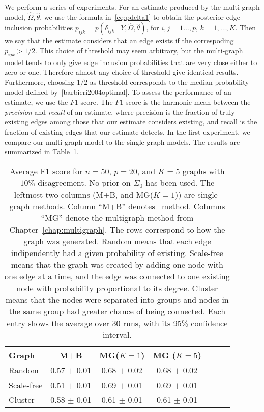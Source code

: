 \documentclass[a4paper, 11pt, oneside]{report}
\newcommand{\1}{\mathds{1}}
\begin{document}
We perform a series of experiments.
For an estimate produced by the multi-graph model, $\hat\Omega, \hat\theta$, we use the formula in~\ref{eq:pdelta1} to obtain the 
posterior edge inclusion probabilities $p_{ijk} = p(\delta_{ijk} \mid Y, \hat\Omega, \hat\theta)$, for $i,j=1\dots,p$, $k=1,\dots,K$.
Then we say that the estimate considers that an edge exists if the correspoding $p_{ijk} > 1/2$.
This choice of threshold may seem arbitrary, but the multi-graph model tends to
only give edge inclusion probabilities that are very close either to 
zero or one.
Therefore almost any choice of threshold give identical results.
Furthermore, choosing $1/2$ as threshold corresponds to the median probability
model defined by~\ref{barbieri2004optimal}.
To assess the performance of an estimate, we use the $F1$ score.
The $F1$ score is the harmonic mean between the \emph{precision} and \emph{recall} of an estimate,
where precision is the fraction of truly existing edges among those that our estimate considers existing,
and recall is the fraction of existing edges that our estimate detects.
In the first experiment, we compare our multi-graph model to the single-graph models.
The results are summarized in Table~\ref{tab:mg-more-graphs}.
\begin{table}[tb]
	\caption{Average F1 score for $n=50$, $p=20$, and $K=5$ graphs with $10\%$ disagreement.
		No prior on $\Sigma_0$ has been used.
		The leftmost two columns (M+B, and MG($K = 1$)) are single-graph methods.
		Column ``M+B'' denotes~\citet{mein2006} method.
		Columns ``MG'' denote the multigraph method from Chapter~\ref{chap:multigraph}.
		The rows correspond to how the graph was generated.
		Random means that each edge indipendently had a given probability of existing.
		Scale-free means that the graph was created by adding one node with one edge at a time, and the edge was connected to one existing node with probability proportional to its degree.
		Cluster means that the nodes were separated into groups and nodes in the same group had greater chance of being connected.
		Each entry shows the average over 30 runs, with its 95\% confidence interval. }
	\label{tab:mg-more-graphs}
	\begin{center}
		\begin{tabular}[c]{l|cccccc}
			\toprule
			Graph      & M+B              & MG($K = 1$)              & MG ($K = 5$)    \\
			\midrule
			Random     & 0.57 $\pm$ 0.01 & 0.68 $\pm$ 0.02 & 0.68 $\pm$ 0.02 \\
			\midrule
			Scale-free & 0.51 $\pm$ 0.01  & 0.69 $\pm$ 0.01 & 0.69 $\pm$ 0.01 \\
			\midrule
			Cluster    & 0.58 $\pm$ 0.01 & 0.61 $\pm$ 0.01  & 0.61 $\pm$ 0.01 \\
			\bottomrule
		\end{tabular}
	\end{center}
\end{table}
\end{document}
